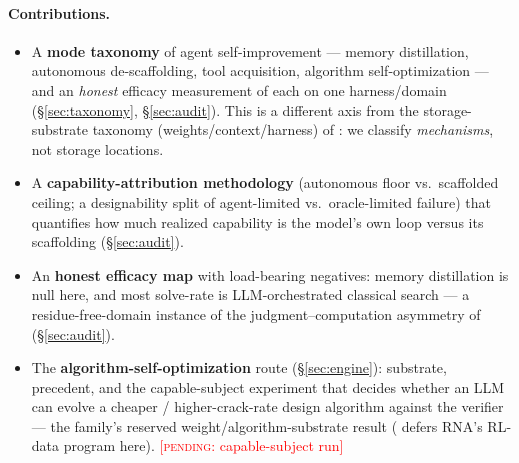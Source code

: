 \documentclass[11pt]{article}
\newcommand{\pending}[1]{\textcolor{red}{[\textsc{pending}: #1]}}
\begin{document}
\paragraph{Contributions.}
\begin{itemize}
\item A \textbf{mode taxonomy} of agent self-improvement --- memory distillation, autonomous
  de-scaffolding, tool acquisition, algorithm self-optimization --- and an \emph{honest} efficacy
  measurement of each on one harness/domain (\S\ref{sec:taxonomy}, \S\ref{sec:audit}). This is a
  different axis from the storage-substrate taxonomy (weights/context/harness) of
  \citet{determinismmanifold}: we classify \emph{mechanisms}, not storage locations.
\item A \textbf{capability-attribution methodology} (autonomous floor vs.\ scaffolded ceiling; a
  designability split of agent-limited vs.\ oracle-limited failure) that quantifies how much realized
  capability is the model's own loop versus its scaffolding (\S\ref{sec:audit}).
\item An \textbf{honest efficacy map} with load-bearing negatives: memory distillation is null here,
  and most solve-rate is LLM-orchestrated classical search --- a residue-free-domain instance of the
  judgment--computation asymmetry of \citet{oracleresidue} (\S\ref{sec:audit}).
\item The \textbf{algorithm-self-optimization} route (\S\ref{sec:engine}): substrate, precedent, and
  the capable-subject experiment that decides whether an LLM can evolve a cheaper / higher-crack-rate
  design algorithm against the verifier --- the family's reserved weight/algorithm-substrate result
  (\citealp{actuation} defers RNA's RL-data program here). \pending{capable-subject run}
\end{itemize}
\end{document}
